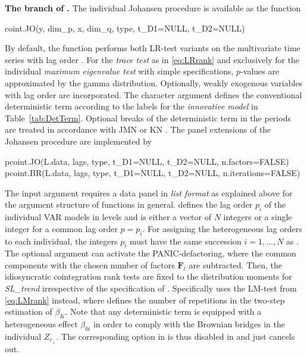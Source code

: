\textbf{The branch of \citeauthor{Johansen1996}.} The individual Johansen procedure is available as the function
\begin{CodeChunk}
\begin{CodeInput}
coint.JO(y, dim_p, x, dim_q, type, t_D1=NULL, t_D2=NULL)
\end{CodeInput}
\end{CodeChunk}
By default, the  function performs both LR-test variants on the multivariate time series  with lag order . For the \textit{trace test} as in \eqref{eq:LRrank} and exclusively for the individual \textit{maximum eigenvalue test} with simple specifications, $p$-values are approximated by the gamma distribution. Optionally, weakly exogenous variables  with lag order  are incorporated. The character argument  defines the conventional deterministic term according to the labels for the \textit{innovative model} in Table~\ref{tab:DetTerm}. Optional breaks of the deterministic term in the periods  are treated in accordance with JMN \citeyearpar{JohansenEtAl2000} or KN \citeyearpar{KuritaNielsen2019}. The panel extensions of the Johansen procedure are implemented by
\begin{CodeChunk}
\begin{CodeInput}
pcoint.JO(L.data, lags, type, t_D1=NULL, t_D2=NULL, n.factors=FALSE)
pcoint.BR(L.data, lags, type, t_D1=NULL, t_D2=NULL, n.iterations=FALSE)
\end{CodeInput}
\end{CodeChunk}
The input argument  requires a data panel in \textit{list format} as explained above for the argument structure of  functions in general.  defines the lag order $ p_i $ of the individual VAR models in levels and is either a vector of $ N $ integers or a single integer for a common lag order $ p=p_i $. For assigning the heterogeneous lag orders to each individual, the integers $ p_i $ must have the same succession $ i = 1, \ldots , N $ as . The optional argument  can activate the PANIC-defactoring, where the common components with the chosen number of factors $ \boldsymbol{F}_t $ are subtracted. Then, the idiosyncratic cointegration rank tests are fixed to the distribution moments for \textit{SL\_trend} irrespective of the specification of . Specifically  uses the LM-test from \eqref{eq:LMrank} instead, where  defines the number of repetitions in the two-step estimation of $ \beta_{K} $. Note that any deterministic term is equipped with a heterogeneous effect $ \beta_{0i} $ in order to comply with the Brownian bridges in the individual $ Z_{r_\perp} $. The corresponding option  in  is thus disabled in  and just cancels out.


